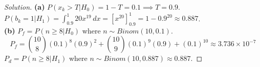 \documentclass[11pt]{article}
\begin{document}
\begin{proof}[Solution]
\textbf{(a)} $P(x_k > T | H_0) = 1 - T = 0.1 \implies T = 0.9$. \\
$P(b_k=1 | H_1) = \int_{0.9}^1 20x^{19} \, dx = [x^{20}]_{0.9}^1 = 1 - 0.9^{20} \approx 0.887$. \\
\textbf{(b)} $P_f = P(n \ge 8 | H_0)$ where $n \sim Binom(10, 0.1)$.
\[ P_f = \binom{10}{8}(0.1)^8(0.9)^2 + \binom{10}{9}(0.1)^9(0.9) + (0.1)^{10} \approx 3.736 \times 10^{-7} \]
$P_d = P(n \ge 8 | H_1)$ where $n \sim Binom(10, 0.887) \approx 0.887$.
\end{proof}
\end{document}
